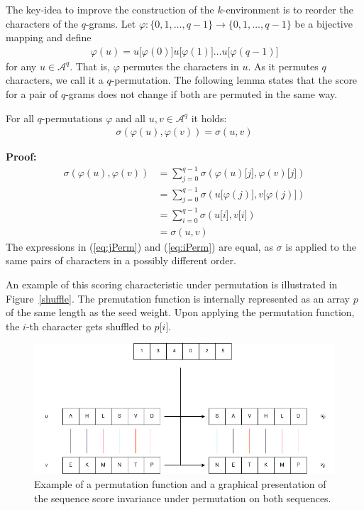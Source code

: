 \documentclass[twoside,a4paper,bsc]{master}
\newcommand{\Subchar}[2]{#1\lbrack #2\rbrack}
\newcommand{\Alpha}[0]{\mathcal{A}}
\newcommand{\Skiptheorem}{\smallskipamount}
\newcommand{\StartFormal}[1]{\par\addvspace{\Skiptheorem}\noindent\textbf{#1}}
\newcommand{\EndFormal}{\par\addvspace{\Skiptheorem}}
\newenvironment{Proof}{\StartFormal{Proof:}}{\EndFormal}
\begin{document}
The key-idea to improve the construction of the \(k\)-environment
is to reorder the characters of the \(q\)-grams. Let
\(\varphi:\{0,1,\ldots,q-1\}\to\{0,1,\ldots,q-1\}\) be a bijective mapping
and define
\begin{align}
\varphi(u)=\Subchar{u}{\varphi(0)}\Subchar{u}{\varphi(1)}\ldots\Subchar{u}{\varphi(q-1)}
\end{align}
for any \(u\in\Alpha^{q}\). That is, \(\varphi\) permutes the
characters in \(u\). As it permutes \(q\) characters, we call it a
\(q\)-permutation. The following lemma
states that the score for a pair of \(q\)-grams does not change if both are
permuted in the same way.
\begin{Lemma}
\label{permutationProof}
For all \(q\)-permutations \(\varphi\) and all \(u,v\in\Alpha^{q}\) it
holds:
\begin{align}
\sigma(\varphi(u),\varphi(v))=\sigma(u,v)
\end{align}
\begin{Proof}
\begin{align}
\sigma(\varphi(u),\varphi(v))
&= \sum_{j=0}^{q-1} \sigma (\Subchar{\varphi(u)}{j},
\Subchar{\varphi(v)}{j})\\
&= \sum_{j=0}^{q-1} \sigma
(\Subchar{u}{\varphi(j)},\Subchar{v}{\varphi(j)})\label{eq:jPerm}\\
&= \sum_{i=0}^{q-1} \sigma
(\Subchar{u}{i},\Subchar{v}{i})\label{eq:iPerm}\\
&= \sigma(u,v)
\end{align}
The expressions in (\ref{eq:jPerm}) and (\ref{eq:iPerm}) are equal,
as \(\sigma\) is applied to the same pairs of characters in
a possibly different order.
\end{Proof}
\end{Lemma}
An example of this scoring characteristic under permutation is illustrated
in
Figure~\ref{shuffle}. The premutation function is internally represented as
an
array \(p\) of the same length as the seed weight. Upon applying the
permutation
function, the \(i\)-th character gets shuffled to \(\Subchar{p}{i}\).
\begin{figure}[t]
\begin{center}
\includegraphics[scale=0.6]{graphics/shuffle.png}
\end{center}
\caption{Example of a permutation function and a graphical presentation of
the
sequence score invariance under permutation on both sequences.}
\label{fig:shuffle}
\end{figure}
\end{document}
